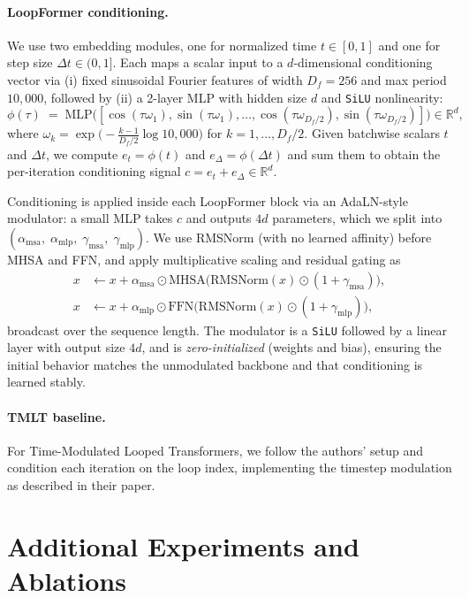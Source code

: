 \paragraph{LoopFormer conditioning.}
We use two embedding modules, one for normalized time $t\in[0,1]$ and one for step size $\Delta t\in(0,1]$. Each maps a scalar input to a $d$-dimensional conditioning vector via (i) fixed sinusoidal Fourier features of width $D_f=256$ and max period $10{,}000$, followed by (ii) a 2-layer MLP with hidden size $d$ and \texttt{SiLU} nonlinearity:
\[
\textstyle \phi(\tau)\;=\;\mathrm{MLP}\big([\cos(\tau\omega_1),\sin(\tau\omega_1),\ldots,\cos(\tau\omega_{D_f/2}),\sin(\tau\omega_{D_f/2})]\big)\in\mathbb{R}^{d},
\]
where $\omega_k = \exp\!\big(-\tfrac{k-1}{D_f/2}\log 10{,}000\big)$ for $k=1,\ldots,D_f/2$. Given batchwise scalars $t$ and $\Delta t$, we compute $e_t=\phi(t)$ and $e_{\Delta}=\phi(\Delta t)$ and sum them to obtain the per-iteration conditioning signal $c=e_t+e_{\Delta}\in\mathbb{R}^{d}$.

Conditioning is applied inside each LoopFormer block via an AdaLN-style modulator:
a small MLP takes $c$ and outputs $4d$ parameters, which we split into
$(\alpha_{\mathrm{msa}},\;\alpha_{\mathrm{mlp}},\;\gamma_{\mathrm{msa}},\;\gamma_{\mathrm{mlp}})$.
We use RMSNorm (with no learned affinity) before MHSA and FFN, and apply multiplicative scaling and residual gating as
\[
\begin{aligned}
x &\leftarrow x + \alpha_{\mathrm{msa}}\odot \mathrm{MHSA}\big(\mathrm{RMSNorm}(x)\odot (1+\gamma_{\mathrm{msa}})\big),\\
x &\leftarrow x + \alpha_{\mathrm{mlp}}\odot \mathrm{FFN}\big(\mathrm{RMSNorm}(x)\odot (1+\gamma_{\mathrm{mlp}})\big),
\end{aligned}
\]
broadcast over the sequence length. The modulator is a \texttt{SiLU} followed by a linear layer with output size $4d$, and is \emph{zero-initialized} (weights and bias), ensuring the initial behavior matches the unmodulated backbone and that conditioning is learned stably.

\paragraph{TMLT baseline.}
For Time-Modulated Looped Transformers, we follow the authors’ setup and condition each iteration on the loop index, implementing the timestep modulation as described in their paper.


\section{Additional Experiments and Ablations}
\label{sec:supp_ablations}

